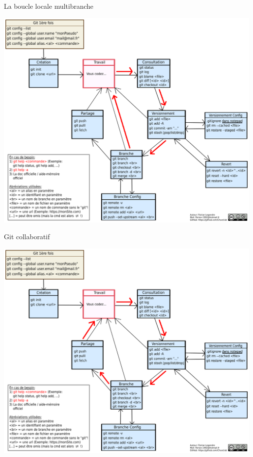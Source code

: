 \documentclass{beamer}
\begin{document}
\begin{frame}{La boucle locale multibranche}
\begin{center}
    \includegraphics[scale=0.28]{images/gitCommandFlow/gitCommandFlow_multilocalLoop.png}
\end{center}
\end{frame}

\begin{frame}{Git collaboratif}
\begin{center}
    \includegraphics[scale=0.28]{images/gitCommandFlow/gitCommandFlow_connectedLoop.png}
\end{center}
\end{frame}
\end{document}
